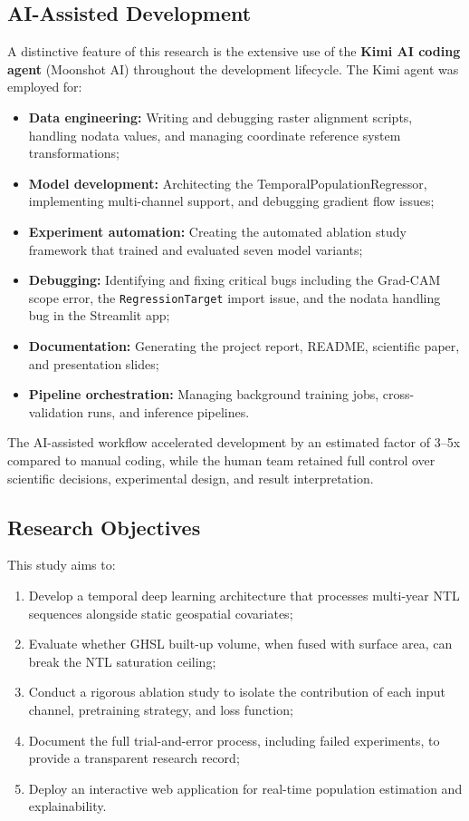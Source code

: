 \documentclass[12pt,a4paper]{article}
\begin{document}
\subsection{AI-Assisted Development}
\label{subsec:ai_agent}

A distinctive feature of this research is the extensive use of the \textbf{Kimi AI coding agent} (Moonshot AI) throughout the development lifecycle. The Kimi agent was employed for:

\begin{itemize}
    \item \textbf{Data engineering:} Writing and debugging raster alignment scripts, handling nodata values, and managing coordinate reference system transformations;
    \item \textbf{Model development:} Architecting the TemporalPopulationRegressor, implementing multi-channel support, and debugging gradient flow issues;
    \item \textbf{Experiment automation:} Creating the automated ablation study framework that trained and evaluated seven model variants;
    \item \textbf{Debugging:} Identifying and fixing critical bugs including the Grad-CAM scope error, the \texttt{RegressionTarget} import issue, and the nodata handling bug in the Streamlit app;
    \item \textbf{Documentation:} Generating the project report, README, scientific paper, and presentation slides;
    \item \textbf{Pipeline orchestration:} Managing background training jobs, cross-validation runs, and inference pipelines.
\end{itemize}

The AI-assisted workflow accelerated development by an estimated factor of 3--5x compared to manual coding, while the human team retained full control over scientific decisions, experimental design, and result interpretation.

\subsection{Research Objectives}
\label{subsec:objectives}

This study aims to:

\begin{enumerate}
    \item Develop a temporal deep learning architecture that processes multi-year NTL sequences alongside static geospatial covariates;
    \item Evaluate whether GHSL built-up volume, when fused with surface area, can break the NTL saturation ceiling;
    \item Conduct a rigorous ablation study to isolate the contribution of each input channel, pretraining strategy, and loss function;
    \item Document the full trial-and-error process, including failed experiments, to provide a transparent research record;
    \item Deploy an interactive web application for real-time population estimation and explainability.
\end{enumerate}
\end{document}
